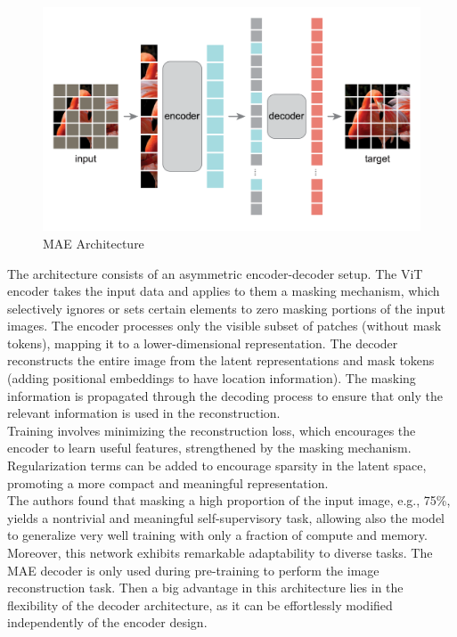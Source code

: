 \begin{figure}[H]
    \centering
    \includegraphics[scale=0.25]{images/mae1.png}
    \caption{MAE Architecture}
    \label{fig:mae1-architecture}
\end{figure}

The architecture consists of an asymmetric encoder-decoder setup. The ViT encoder takes the input data and applies to them a masking mechanism, which selectively ignores or sets certain elements to zero masking portions of the input images.
The encoder processes only the visible subset of patches (without mask tokens), mapping it to a lower-dimensional representation.
The decoder reconstructs the entire image from the latent representations and mask tokens (adding positional embeddings to have location information). The masking information is propagated through the decoding process to ensure that only the relevant information is used in the reconstruction.\\

Training involves minimizing the reconstruction loss, which encourages the encoder to learn useful features, strengthened by the masking mechanism. Regularization terms can be added to encourage sparsity in the latent space, promoting a more compact and meaningful representation.\\
The authors found that masking a high proportion of the input image, e.g., 75\%, yields a nontrivial and meaningful self-supervisory task, allowing also the model to generalize very well training with only a fraction of compute and memory.\\

Moreover, this network exhibits remarkable adaptability to diverse tasks. The MAE decoder is only used during pre-training to perform the image reconstruction task. Then a big advantage in this architecture lies in the flexibility of the decoder architecture, as it can be effortlessly modified independently of the encoder design.

